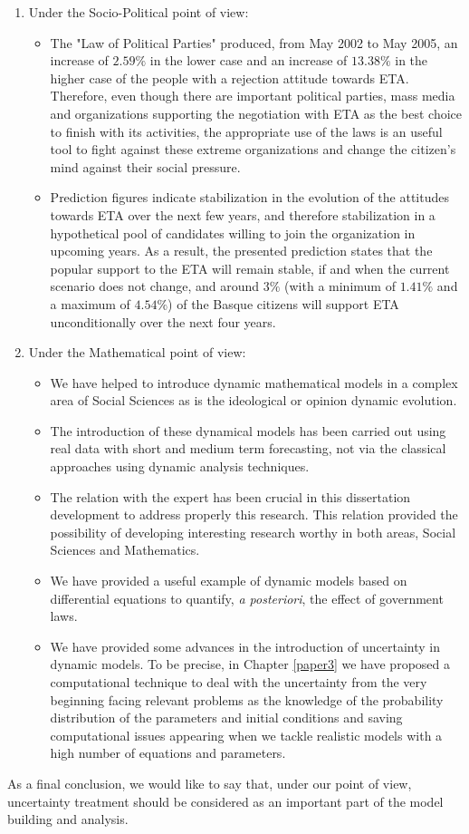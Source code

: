 \begin{enumerate}
\item Under the Socio-Political point of view:
	\begin{itemize}
	\item The "Law of Political Parties" produced, from May 2002 to  May 2005, an increase of $2.59\%$ in the lower case and an increase of $13.38\%$ in the higher case of the people with a rejection attitude towards ETA. Therefore, even though there are important political parties, mass media and organizations supporting the negotiation with ETA as the best choice to finish with its activities, the appropriate use of the laws is an useful tool to fight against these extreme organizations and change the citizen's mind against their social pressure.
	\item Prediction figures indicate stabilization in the evolution of the attitudes towards ETA over the next few years, and therefore stabilization in a hypothetical pool of candidates willing to join the organization in upcoming years. As a result, the presented prediction states that the popular support to the ETA will remain stable, if and when the current scenario does not change, and around $3\%$ (with a minimum of $1.41\%$ and a maximum of $4.54\%$) of the Basque citizens will support ETA unconditionally over the next four years. 
	\end{itemize}

\item Under the Mathematical point of view:
	\begin{itemize}
	\item We have helped to introduce dynamic mathematical models in a complex area of Social Sciences as is the ideological or opinion dynamic evolution.
	\item The introduction of these dynamical models has been carried out using real data with short and medium term forecasting, not via the classical approaches using dynamic analysis techniques.
	\item The relation with the expert has been crucial in this dissertation development to address properly this research. This relation provided the possibility of developing interesting research worthy in both areas, Social Sciences and Mathematics. 
	\item We have provided a useful example of dynamic models based on differential equations to quantify, \textit{a posteriori}, the effect of government laws.
	\item We have provided some advances in the introduction of uncertainty in dynamic models. To be precise, in Chapter \ref{paper3} we have proposed a computational technique to deal with the uncertainty from the very beginning facing relevant problems as the knowledge of the probability distribution of the parameters and initial conditions and saving computational issues appearing when we tackle realistic models with a high number of equations and parameters. 
	\end{itemize}
\end{enumerate}

As a final conclusion, we would like to say that, under our point of view, uncertainty treatment should be considered as an important part of the model building and analysis.